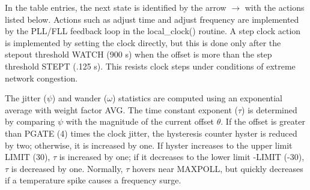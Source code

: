 In the table entries, the next state is identified by the arrow $ \rightarrow $
with the actions listed below. Actions such as adjust time and
adjust frequency are implemented by the PLL/FLL feedback loop in the
local\_clock() routine. A step clock action is implemented by setting
the clock directly, but this is done only after the stepout threshold
WATCH (900 s) when the offset is more than the step threshold STEPT
(.125 s). This resists clock steps under conditions of extreme
network congestion.

The jitter ($ \psi $) and wander ($ \omega $) statistics are computed using an
exponential average with weight factor AVG. The time constant
exponent ($ \tau $) is determined by comparing $ \psi $ with the magnitude of
the current offset $ \theta $. If the offset is greater than PGATE (4)
times the clock jitter, the hysteresis counter hyster is reduced by
two; otherwise, it is increased by one. If hyster increases to the
upper limit LIMIT (30), $ \tau $ is increased by one; if it decreases to
the lower limit -LIMIT (-30), $ \tau $ is decreased by one. Normally, $ \tau $
hovers near MAXPOLL, but quickly decreases if a temperature spike
causes a frequency surge.
